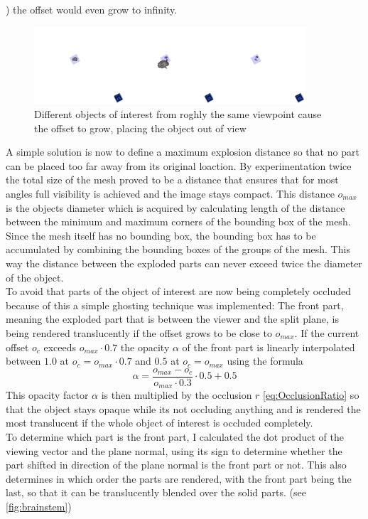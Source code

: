 ) the offset would even grow to infinity.\\
\begin{figure}[tb]
	\centering
	\includegraphics[width=0.9\textwidth]{chapters/figures/infinity}
	\caption{Different objects of interest from roghly the same viewpoint cause the offset to grow, placing the object out of view}
	\label{fig:infinity}
\end{figure}
A simple solution is now to define a maximum explosion distance so that no part can be placed too far away from its original loaction. By experimentation twice the total size of the mesh proved to be a distance that ensures that for most angles full visibility is achieved and the image stays compact. This distance $o_{max}$ is the objects diameter which is acquired by calculating length of the distance between the minimum and maximum corners of the bounding box of the mesh. Since the mesh itself has no bounding box, the bounding box has to be accumulated by combining the bounding boxes of the groups of the mesh. This way the distance between the exploded parts can never exceed twice the diameter of the object.\\
To avoid that parts of the object of interest are now being completely occluded because of this a simple ghosting technique was implemented: 
The front part, meaning the exploded part that is between the viewer and the split plane, is being rendered translucently if the offset grows to be close to $o_{max}$. 
If the current offset $o_c$ exceeds $o_{max} \cdot 0.7$ the opacity $\alpha$ of the front part is linearly interpolated between $1.0$ at $o_c = o_{max} \cdot 0.7$ and $0.5$ at  $o_c = o_{max}$ using the formula
\begin{equation}
	\alpha = \frac{o_{max}-o_c}{o_{max} \cdot 0.3} \cdot 0.5 + 0.5
\end{equation}
This opacity factor $\alpha$ is then multiplied by the occlusion $r$ \ref{eq:OcclusionRatio}  so that the object stays opaque while its not occluding anything and is rendered the most translucent if the whole object of interest is occluded completely.\\
To determine which part is the front part, I calculated the dot product of the viewing vector and the plane normal, using its sign to determine whether the part shifted in direction of the plane normal is the front part or not. This also determines in which order the parts are rendered, with the front part being the last, so that it can be translucently blended over the solid parts. (see \ref{fig:brainstem})\\
